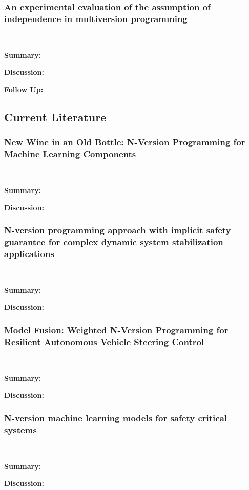\documentclass[article]{IEEEtran}
\begin{document}
\subsubsection{An experimental evaluation of the assumption of independence in multiversion programming}
\cite{knightetal}
\hfill\\
\par
\textbf{Summary:} 
\par
\textbf{Discussion:}
\par
\textbf{Follow Up:} 
\cite{kfollowup}



\subsection{Current Literature}
\subsubsection{New Wine in an Old Bottle: N-Version Programming for Machine Learning Components}
\cite{newwine}
\hfill\\
\par
\textbf{Summary:} 
\par
\textbf{Discussion:}

\subsubsection{N-version programming approach with implicit safety guarantee for complex dynamic system stabilization applications}
\cite{nadiretal}
\hfill\\
\par
\textbf{Summary:} 
\par
\textbf{Discussion:}

\subsubsection{Model Fusion: Weighted N-Version Programming for Resilient Autonomous Vehicle Steering Control}
\cite{wuetal}
\hfill\\
\par
\textbf{Summary:} 
\par
\textbf{Discussion:}

\subsubsection{N-version machine learning models for safety critical systems}
\cite{machida2019n}
\hfill\\
\par
\textbf{Summary:} 
\par
\textbf{Discussion:}
\end{document}
